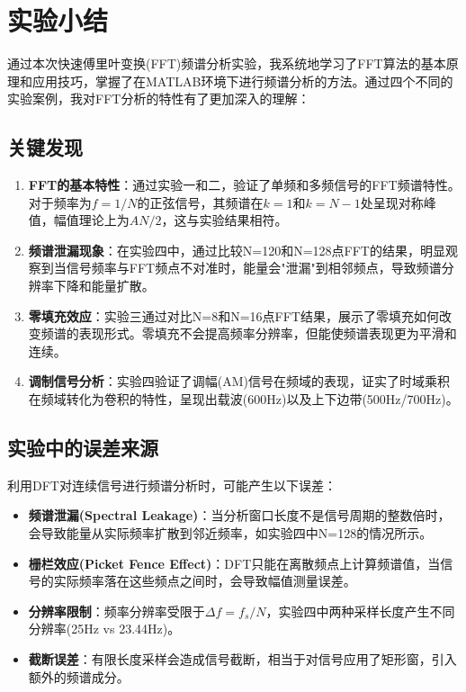 \documentclass[12pt,hyperref,a4paper,UTF8]{ctexart}
\begin{document}
\section{实验小结}

通过本次快速傅里叶变换(FFT)频谱分析实验，我系统地学习了FFT算法的基本原理和应用技巧，掌握了在MATLAB环境下进行频谱分析的方法。通过四个不同的实验案例，我对FFT分析的特性有了更加深入的理解：

\subsection{关键发现}

\begin{enumerate}
    \item \textbf{FFT的基本特性}：通过实验一和二，验证了单频和多频信号的FFT频谱特性。对于频率为$f=1/N$的正弦信号，其频谱在$k=1$和$k=N-1$处呈现对称峰值，幅值理论上为$AN/2$，这与实验结果相符。
    
    \item \textbf{频谱泄漏现象}：在实验四中，通过比较N=120和N=128点FFT的结果，明显观察到当信号频率与FFT频点不对准时，能量会"泄漏"到相邻频点，导致频谱分辨率下降和能量扩散。
    
    \item \textbf{零填充效应}：实验三通过对比N=8和N=16点FFT结果，展示了零填充如何改变频谱的表现形式。零填充不会提高频率分辨率，但能使频谱表现更为平滑和连续。
    
    \item \textbf{调制信号分析}：实验四验证了调幅(AM)信号在频域的表现，证实了时域乘积在频域转化为卷积的特性，呈现出载波(600Hz)以及上下边带(500Hz/700Hz)。
\end{enumerate}

\subsection{实验中的误差来源}

利用DFT对连续信号进行频谱分析时，可能产生以下误差：

\begin{itemize}
    \item \textbf{频谱泄漏(Spectral Leakage)}：当分析窗口长度不是信号周期的整数倍时，会导致能量从实际频率扩散到邻近频率，如实验四中N=128的情况所示。
    
    \item \textbf{栅栏效应(Picket Fence Effect)}：DFT只能在离散频点上计算频谱值，当信号的实际频率落在这些频点之间时，会导致幅值测量误差。
    
    \item \textbf{分辨率限制}：频率分辨率受限于$\Delta f = f_s/N$，实验四中两种采样长度产生不同分辨率(25Hz vs 23.44Hz)。
    
    \item \textbf{截断误差}：有限长度采样会造成信号截断，相当于对信号应用了矩形窗，引入额外的频谱成分。
\end{itemize}
\end{document}

